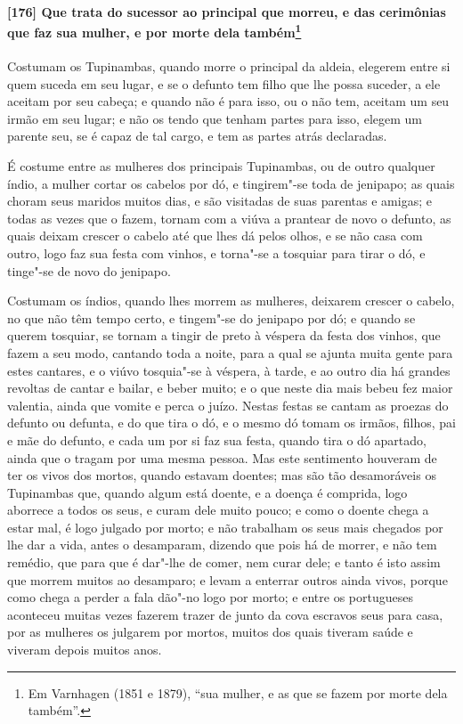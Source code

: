 \begin{linenumbers}
\paragraph{[176] Que trata do sucessor ao principal que morreu, e das cerimônias que faz sua
mulher, e por morte dela também\protect\footnote{ Em Varnhagen (1851 e 1879), ``sua
mulher, e as que se fazem por morte dela também''.}}\quad
Costumam os Tupinambas, quando morre o principal da aldeia, elegerem entre si quem suceda
em seu lugar, e se o defunto tem filho que lhe possa suceder, a ele aceitam por seu
cabeça; e quando não é para isso, ou o não tem, aceitam um seu irmão em seu lugar; e não
os tendo que tenham partes para isso, elegem um parente seu, se é capaz de tal cargo, e
tem as partes atrás declaradas.

É costume entre as mulheres dos principais Tupinambas, ou de outro qualquer índio, a
mulher cortar os cabelos por dó, e tingirem"-se toda de jenipapo; as quais choram seus
maridos muitos dias, e são visitadas de suas parentas e amigas; e todas as vezes que o
fazem, tornam com a viúva a prantear de novo o defunto, as quais deixam crescer o cabelo
até que lhes dá pelos olhos, e se não casa com outro, logo faz sua festa com vinhos, e
torna"-se a tosquiar para tirar o dó, e tinge"-se de novo do jenipapo.

Costumam os índios, quando lhes morrem as mulheres, deixarem crescer o cabelo, no que não
têm tempo certo, e tingem"-se do jenipapo por dó; e quando se querem tosquiar, se tornam a
tingir de preto à véspera da festa dos vinhos, que fazem a seu modo, cantando toda a
noite, para a qual se ajunta muita gente para estes cantares, e o viúvo tosquia"-se à
véspera, à tarde, e ao outro dia há grandes revoltas de cantar e bailar, e beber muito; e
o que neste dia mais bebeu fez maior valentia, ainda que vomite e perca o juízo. Nestas
festas se cantam as proezas do defunto ou defunta, e do que tira o dó, e o mesmo dó tomam
os irmãos, filhos, pai e mãe do defunto, e cada um por si faz sua festa, quando tira o dó
apartado, ainda que o tragam por uma mesma pessoa. Mas este sentimento houveram de ter os
vivos dos mortos, quando estavam doentes; mas são tão desamoráveis os Tupinambas que,
quando algum está doente, e a doença é comprida, logo aborrece a todos os seus, e curam
dele muito pouco; e como o doente chega a estar mal, é logo julgado por morto; e não
trabalham os seus mais chegados por lhe dar a vida, antes o desamparam, dizendo que pois
há de morrer, e não tem remédio, que para que é dar"-lhe de comer, nem curar dele; e tanto
é isto assim que morrem muitos ao desamparo; e levam a enterrar outros ainda vivos, porque
como chega a perder a fala dão"-no logo por morto; e entre os portugueses aconteceu muitas
vezes fazerem trazer de junto da cova escravos seus para casa, por as mulheres os julgarem
por mortos, muitos dos quais tiveram saúde e viveram depois muitos anos.


\end{linenumbers}
